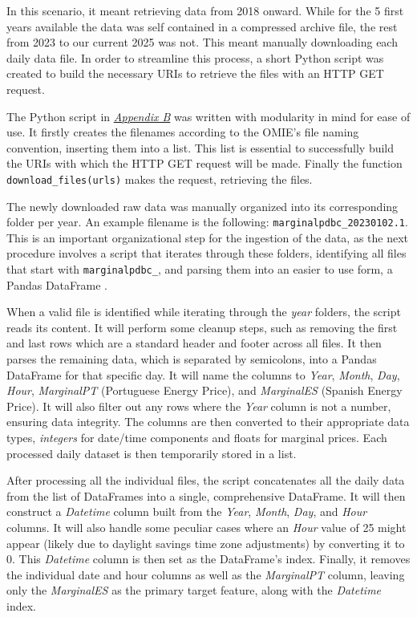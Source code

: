 \documentclass[12pt]{report} %
\begin{document}
In this scenario, it meant retrieving data from 2018 onward. While for the 5 first years available the data was self contained in a compressed archive file, the rest from 2023 to our current 2025 was not. This meant manually downloading each daily data file. In order to streamline this process, a short Python script was created to build the necessary URIs to retrieve the files with an HTTP GET request.

The Python script in \textit{\hyperref[app:appendix_b_data_scrapping]{Appendix B}} was written with modularity in mind for ease of use. It firstly creates the filenames according to the OMIE's file naming convention, inserting them into a list. This list is essential to successfully build the URIs with which the HTTP GET request will be made. Finally the function \verb|download_files(urls)| makes the request, retrieving the files.

The newly downloaded raw data was manually organized into its corresponding folder per year. An example filename is the following: \small{\verb|marginalpdbc_20230102.1|}. This is an important organizational step for the ingestion of the data, as the next procedure involves a script that iterates through these folders, identifying all files that start with \small{\verb|marginalpdbc_|}, and parsing them into an easier to use form, a Pandas DataFrame \cite{dataframe}.

When a valid file is identified while iterating through the \textit{year} folders, the script reads its content. It will perform some cleanup steps, such as removing the first and last rows which are a standard header and footer across all files. It then parses the remaining data, which is separated by semicolons, into a Pandas DataFrame for that specific day. It will name the columns to \textit{Year}, \textit{Month}, \textit{Day}, \textit{Hour}, \textit{MarginalPT} (Portuguese Energy Price), and \textit{MarginalES} (Spanish Energy Price). It will also filter out any rows where the \textit{Year} column is not a number, ensuring data integrity. The columns are then converted to their appropriate data types, \textit{integers} for date/time components and \textit{}{floats} for marginal prices. Each processed daily dataset is then temporarily stored in a list.

After processing all the individual files, the script concatenates all the daily data from the list of DataFrames into a single, comprehensive DataFrame. It will then construct a \textit{Datetime} column built from the \textit{Year}, \textit{Month}, \textit{Day}, and \textit{Hour} columns. It will also handle some peculiar cases where an \textit{Hour} value of 25 might appear (likely due to daylight savings time zone adjustments) by converting it to 0. This \textit{Datetime} column is then set as the DataFrame's index. Finally, it removes the individual date and hour columns as well as the \textit{MarginalPT} column, leaving only the \textit{MarginalES} as the primary target feature, along with the \textit{Datetime} index.
\end{document}
